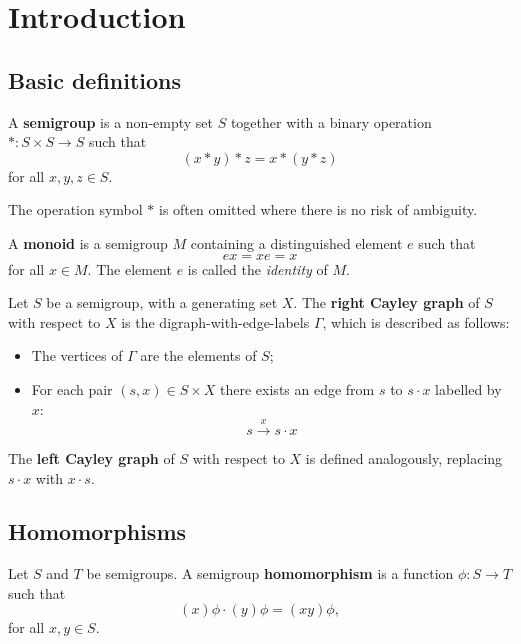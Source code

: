\chapter{Introduction}
\label{chap:intro}

\section{Basic definitions}
\label{sec:intro-basic}

\begin{definition}
  \label{def:semigroup}
  A \textbf{semigroup} is a non-empty set $S$ together with
  a binary operation $*: S \times S \to S$ such that
  $$(x * y) * z = x * (y * z)$$
  for all $x, y, z \in S$.
\end{definition}
The operation symbol $*$ is often omitted where there is no risk of ambiguity.

\begin{definition}
  \label{def:monoid}
  A \textbf{monoid} is a semigroup $M$ containing a distinguished element $e$
  such that
  $$ex = xe = x$$
  for all $x \in M$.  The element $e$ is called the \textit{identity} of $M$.
\end{definition}

\begin{definition}
  \label{def:cayley-graph}
  Let $S$ be a semigroup, with a generating set $X$.  The \textbf{right Cayley
    graph} of $S$ with respect to $X$ is the digraph-with-edge-labels $\Gamma$,
  which is described as follows:
  \begin{itemize}
  \item The vertices of $\Gamma$ are the elements of $S$;
  \item For each pair $(s, x) \in S \times X$ there exists an edge from $s$ to
    $s \cdot x$ labelled by $x$:
    $$s \overset{x}{\longrightarrow} s \cdot x$$
  \end{itemize}
  The \textbf{left Cayley graph} of $S$ with respect to $X$ is defined
  analogously, replacing $s \cdot x$ with $x \cdot s$.
\end{definition}

\section{Homomorphisms}
\label{sec:homomorphisms}

\begin{definition}
  \label{def:homomorphism}
  Let $S$ and $T$ be semigroups.  A semigroup \textbf{homomorphism} is a
  function $\phi: S \to T$ such that
  $$(x)\phi \cdot (y)\phi = (xy)\phi,$$
  for all $x, y \in S$.
\end{definition}

